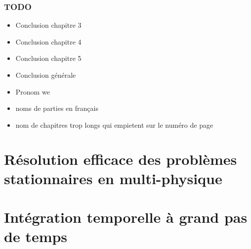 



\makeflyleaf
{}

\tableofcontents
{}



\section*{TODO}
\begin{itemize}
  \item Conclusion chapitre 3
  \item Conclusion chapitre 4
  \item Conclusion chapitre 5
  \item Conclusion générale
  \item Pronom we
  \item noms de parties en français
  \item nom de chapitres trop longs qui empietent sur le numéro de page
\end{itemize}


\part{Résolution efficace des problèmes stationnaires en multi-physique}

  

  

  

\part{Intégration temporelle à grand pas de temps}

    

    







